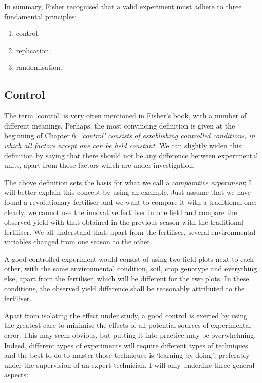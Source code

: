 \documentclass[a4paper,12pt,oneside]{book}
\providecommand{\tightlist}{%
  \setlength{\itemsep}{0pt}\setlength{\parskip}{0pt}}
\begin{document}
In summary, Fisher recognised that a valid experiment must adhere to three fundamental principles:

\begin{enumerate}
\def\labelenumi{\arabic{enumi}.}
\tightlist
\item
  control;
\item
  replication;
\item
  randomisation.
\end{enumerate}

\hypertarget{control}{%
\subsection{Control}\label{control}}

The term `control' is very often mentioned in Fisher's book, with a number of different meanings. Perhaps, the most convincing definition is given at the beginning of Chapter 6: \emph{`control' consists of establishing controlled conditions, in which all factors except one can be held constant}. We can slightly widen this definition by saying that there should not be any difference between experimental units, apart from those factors which are under investigation.

The above definition sets the basis for what we call a \emph{comparative experiment}; I will better explain this concept by using an example. Just assume that we have found a revolutionary fertiliser and we want to compare it with a traditional one: clearly, we cannot use the innovative fertiliser in one field and compare the observed yield with that obtained in the previous season with the traditional fertiliser. We all understand that, apart from the fertiliser, several environmental variables changed from one season to the other.

A good controlled experiment would consist of using two field plots next to each other, with the same environmental condition, soil, crop genotype and everything else, apart from the fertiliser, which will be different for the two plots. In these conditions, the observed yield difference shall be reasonably attributed to the fertiliser.

Apart from isolating the effect under study, a good control is exerted by using the greatest care to minimise the effects of all potential sources of experimental error. This may seem obvious, but putting it into practice may be overwhelming. Indeed, different types of experiments will require different types of techniques and the best to do to master those techniques is `learning by doing', preferably under the supervision of an expert technician. I will only underline three general aspects:
\end{document}
